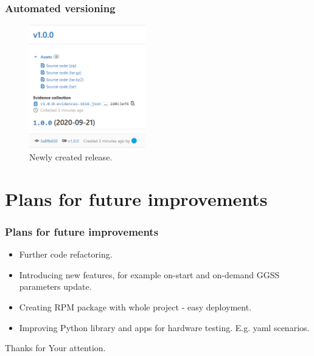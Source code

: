 \documentclass[10pt]{beamer}
\begin{document}
\begin{frame}[fragile]
\frametitle{Automated versioning}
\begin{figure}
    \centering
    \includegraphics[width=0.45\textwidth]{resources/new_release.PNG}
    \caption{Newly created release.}
\end{figure}
\end{frame}


\section{Plans for future improvements}


\begin{frame}[fragile]
\frametitle{Plans for future improvements}
\begin{itemize}
\item Further code refactoring.
\item Introducing new features, for example on-start and on-demand GGSS parameters update.
\item Creating RPM package with whole project - easy deployment.
\item Improving Python library and apps for hardware testing. E.g. yaml scenarios.
\end{itemize}
\end{frame}

\begin{frame}[c]
\hfill
\begin{center}
\large{
	Thanks for Your attention.
}
\hfill
\end{center}
\end{frame}
\end{document}

